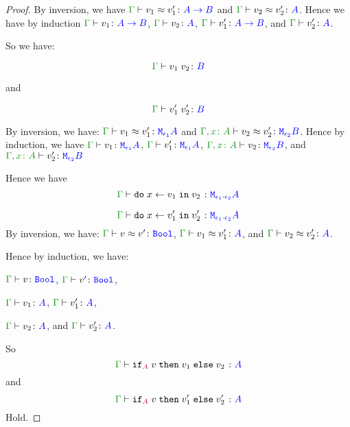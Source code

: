 \documentclass{report}
\begin{document}
\begin{framed}
\begin{proof}
            By inversion, we have $\gberelation{v_1}{v_1'}{\ab}$ and $\gberelation{v_2}{v_2'}{A}$. Hence we have by induction $\gtyperelation{v_1}{\ab}$, $\gtyperelation{v_2}{A}$, $\gtyperelation{v_1'}{\ab}$, and $\gtyperelation{v_2'}{A}$.
        
            So we have:
        
            \begin{equation}
                \gtyperelation{\apply{v_1}{v_2}}{B}
            \end{equation}
        
            and
        
            
            \begin{equation}
                \gtyperelation{\apply{v_1'}{v_2'}}{B}
            \end{equation}
        
        \case{\eqbind}
            By inversion, we have:
            $\gberelation{v_1}{v_1'}{\M{\e_1}{A}}$ and
            $\berelation{\gax}{v_2}{v_2'}{\M{\e_2}{B}}$.
            Hence by induction, we have 
            $\gtyperelation{v_1}{\M{\e_1}{A}}$,
            $\gtyperelation{v_1'}{\M{\e_1}{A}}$,
            $\typerelation{\gax}{v_2}{\M{\e_2}{B}}$, and 
            $\typerelation{\gax}{v_2'}{\M{\e_2}{B}}$
        
            Hence we have 
            \begin{equation}
                \gtyperelation{\doin{x}{v_1}{v_2}}{\M{\e_1\dot\e_2}{A}}
            \end{equation}
        
            
            \begin{equation}
                \gtyperelation{\doin{x}{v_1'}{v_2'}}{\M{\e_1\dot\e_2}{A}}
            \end{equation}
        \case{\eqif}
        By inversion, we have:
        $\gberelation{v}{v'}{\B}$,
        $\gberelation{v_1}{v_1'}{ A}$, and
        $\gberelation{v_2}{v_2'}{ A}$.
        
        Hence by induction, we have:
        
        $\gtyperelation{v}{\B}$,
        $\gtyperelation{v'}{\B}$,
        
        $\gtyperelation{v_1}{ A}$,
        $\gtyperelation{v_1'}{ A}$,
        
        
        $\gtyperelation{v_2}{ A}$, and
        $\gtyperelation{v_2'}{ A}$.
        
        So 
        \begin{equation}
            \gtyperelation{\pifthenelse{A}{v}{v_1}{v_2}}{ A}
        \end{equation}
        and
        \begin{equation}
            \gtyperelation{\pifthenelse{A}{v}{v_1'}{v_2'}}{ A}
        \end{equation}
        Hold.
        \case{\eqsubtype}
        

\end{proof}
\end{framed}
\end{document}
